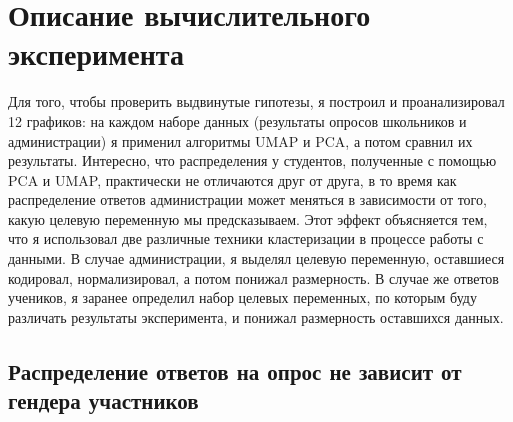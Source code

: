 \section{Описание вычислительного эксперимента}

Для того, чтобы проверить выдвинутые гипотезы, я построил и проанализировал 12 графиков: на каждом наборе данных (результаты опросов школьников и администрации) я применил алгоритмы UMAP и PCA, а потом сравнил их результаты.
Интересно, что распределения у студентов, полученные с помощью PCA и UMAP, практически не отличаются друг от друга, в то время как распределение ответов администрации может меняться в зависимости от того, какую целевую переменную мы предсказываем.
Этот эффект объясняется тем, что я использовал две различные техники кластеризации в процессе работы с данными.
В случае администрации, я выделял целевую переменную, оставшиеся кодировал, нормализировал, а потом понижал размерность.
В случае же ответов учеников, я заранее определил набор целевых переменных, по которым буду различать результаты эксперимента, и понижал размерность оставшихся данных.

\subsection{Распределение ответов на опрос не зависит от гендера участников} \label{hypothesis::1}

